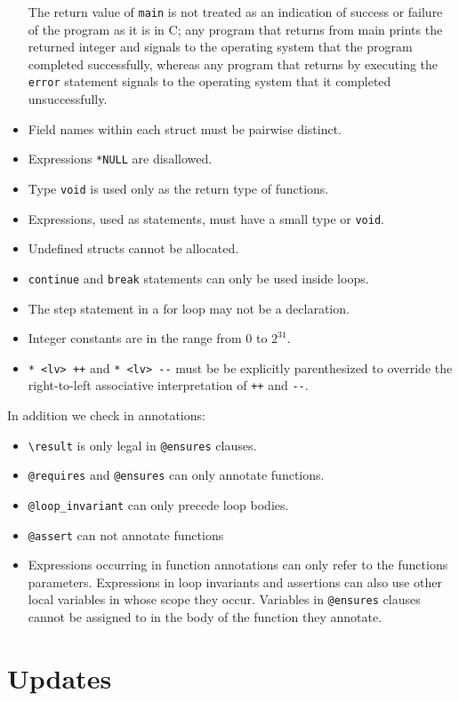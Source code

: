 \documentclass[11pt]{article}
\begin{document}
\begin{itemize}
  The return value of \lstinline'main' is not treated as an indication of
  success or failure of the program as it is in C; any program that
  returns from main prints the returned integer and signals to the
  operating system that the program completed successfully, whereas
  any program that returns by executing the \lstinline'error' statement
  signals to the operating system that it completed unsuccessfully.
\item Field names within each struct must be pairwise distinct.
\item Expressions \lstinline'*NULL' are disallowed.
\item Type \lstinline'void' is used only as the return type of functions.
\item Expressions, used as statements, must have a small type or \lstinline'void'.
\item Undefined structs cannot be allocated.
\item \lstinline'continue' and \lstinline'break' statements can
  only be used inside loops.
\item The step statement in a for loop may not be a declaration.
\item Integer constants are in the range from $0$ to $2^{31}$.
\item \lstinline'* <lv> ++' and \lstinline'* <lv> --' must be
  be explicitly parenthesized to override the right-to-left
  associative interpretation of \lstinline'++' and \lstinline'--'.
\end{itemize}

In addition we check in annotations:
\begin{itemize}
\item \lstinline'\result' is only legal in \lstinline'@ensures' clauses.
\item \lstinline'@requires' and \lstinline'@ensures' can only annotate functions.
\item \lstinline'@loop_invariant' can only precede loop bodies.
\item \lstinline'@assert' can not annotate functions
\item Expressions occurring in function annotations can only refer to
  the functions parameters.  Expressions in loop invariants and
  assertions can also use other local variables in whose scope they
  occur.  Variables in \lstinline'@ensures' clauses cannot be assigned to
  in the body of the function they annotate.
\end{itemize}

\section{Updates}
\label{sec:updates}
\hypertarget{sec:updates}{}
\end{document}

